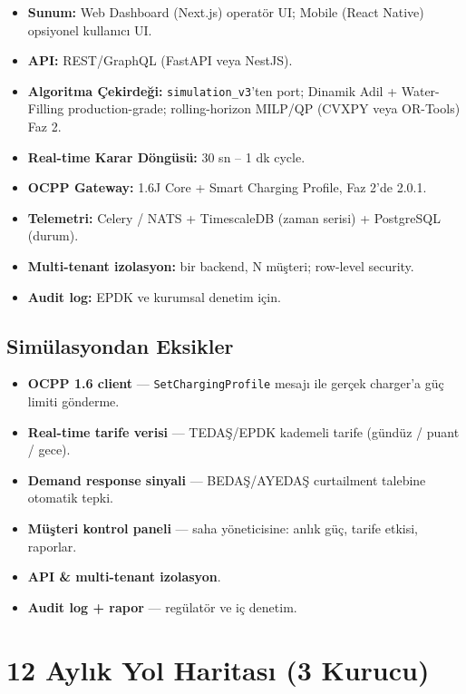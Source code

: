 \documentclass[11pt,a4paper]{article}
\begin{document}
\begin{itemize}
    \item \textbf{Sunum:} Web Dashboard (Next.js) operatör UI; Mobile (React Native) opsiyonel kullanıcı UI.
    \item \textbf{API:} REST/GraphQL (FastAPI veya NestJS).
    \item \textbf{Algoritma Çekirdeği:} \texttt{simulation\_v3}'ten port; Dinamik Adil + Water-Filling production-grade; rolling-horizon MILP/QP (CVXPY veya OR-Tools) Faz 2.
    \item \textbf{Real-time Karar Döngüsü:} 30 sn -- 1 dk cycle.
    \item \textbf{OCPP Gateway:} 1.6J Core + Smart Charging Profile, Faz 2'de 2.0.1.
    \item \textbf{Telemetri:} Celery / NATS + TimescaleDB (zaman serisi) + PostgreSQL (durum).
    \item \textbf{Multi-tenant izolasyon:} bir backend, N müşteri; row-level security.
    \item \textbf{Audit log:} EPDK ve kurumsal denetim için.
\end{itemize}

\subsection{Simülasyondan Eksikler}
\begin{itemize}
    \item \textbf{OCPP 1.6 client} --- \texttt{SetChargingProfile} mesajı ile gerçek charger'a güç limiti gönderme.
    \item \textbf{Real-time tarife verisi} --- TEDAŞ/EPDK kademeli tarife (gündüz / puant / gece).
    \item \textbf{Demand response sinyali} --- BEDAŞ/AYEDAŞ curtailment talebine otomatik tepki.
    \item \textbf{Müşteri kontrol paneli} --- saha yöneticisine: anlık güç, tarife etkisi, raporlar.
    \item \textbf{API \& multi-tenant izolasyon}.
    \item \textbf{Audit log + rapor} --- regülatör ve iç denetim.
\end{itemize}

\section{12 Aylık Yol Haritası (3 Kurucu)}
\end{document}
